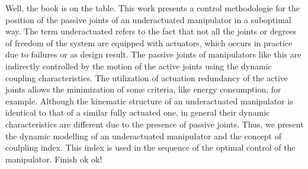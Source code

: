 Well, the book is on the table. This work presents a control methodologie for the position of the  passive joints of an underactuated manipulator in a suboptimal way. The term underactuated refers to the fact that not all the joints or degrees of freedom of the system are equipped with actuators, which occurs in practice due to failures or as design result. The passive joints of manipulators like this are indirectly controlled by the motion of the active joints using the dynamic coupling characteristics. The utilization of actuation redundancy of the active joints allows the minimization of some criteria, like energy consumption, for example. Although the kinematic structure of an underactuated manipulator is identical to that of a similar fully actuated one, in general their dynamic characteristics are different due to the presence of passive joints. Thus, we present the dynamic modelling of an underactuated manipulator and the concept of coulpling index. This index is used in the sequence of the optimal control of the manipulator. Finish ok ok!
